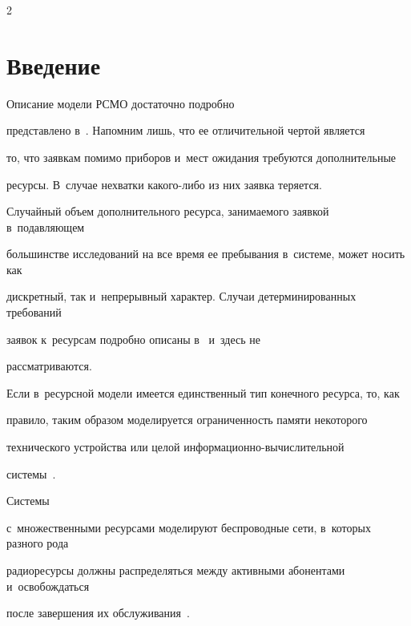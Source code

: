 \begin{multicols}{2}





\label{st\stat}





\section{Введение}





Описание модели РСМО достаточно подробно 


представлено в~\cite{Ch_1}. Напомним лишь, что ее отличительной чертой является 


то, что заявкам помимо приборов и~мест ожидания требуются дополнительные 


ресурсы. В~случае нехватки ка\-ко\-го-ли\-бо из них заявка теряется.


Случайный объем дополнительного ресурса, занимаемого заявкой в~подавляющем 


большинстве исследований на все время ее пребывания в~сис\-те\-ме, может носить как 


дискретный, так и~непрерывный характер. Случаи детерминированных требований 


заявок к~ресурсам подробно описаны в~\cite{Kelly,Ross,Basharin} и~здесь не 


рассматриваются.





Если в~ресурсной модели имеется единственный тип конечного ресурса, то, как 


правило, таким образом моделируется ограниченность памяти некоторого 


технического устройства или целой ин\-фор\-ма\-ци\-он\-но-вы\-чис\-ли\-тель\-ной 


сис\-те\-мы~\cite{Romm_21_1971,Kac,Tihonenko_27_1985,Pechinkin_29_2012}. 


%


Сис\-те\-мы 


с~множественными ресурсами моделируют беспроводные сети, в~которых разного рода 


радиоресурсы должны распределяться между активными абонентами и~освобождаться 


после завершения  их обслуживания~\cite{Naumov_3_2016}.



\end{multicols}
